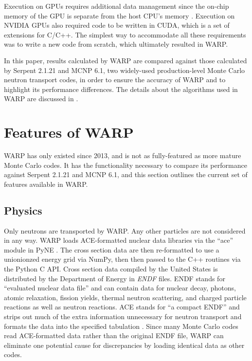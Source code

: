 \documentclass[preprint,12pt]{elsarticle}
\begin{document}
Execution on GPUs requires additional data management since the on-chip memory of the GPU is separate from the host CPU's memory \cite{cuda}.  Execution on NVIDIA GPUs also required code to be written in CUDA, which is a set of extensions for C/C++.  The simplest way to accommodate all these requirements was to write a new code from scratch, which ultimately resulted in WARP.  

In this paper, results calculated by WARP are compared against those calculated by Serpent 2.1.21 and MCNP 6.1, two widely-used production-level Monte Carlo neutron transport codes, in order to ensure the accuracy of WARP and to highlight its performance differences.  The details about the algorithms used in WARP are discussed in \cite{algorithms}.


\section{Features of WARP}
\label{sec:features}

WARP has only existed since 2013, and is not as fully-featured as more mature Monte Carlo codes.  It has the functionality necessary to compare its performance against  Serpent 2.1.21 and MCNP 6.1, and this section outlines the current set of features available in WARP.  

\subsection{Physics}

Only neutrons are transported by WARP.  Any other particles are not considered in any way.  WARP loads ACE-formatted nuclear data libraries via the ``ace'' module in PyNE \cite{pyne}.  The cross section data are then re-formatted to use a unionionzed energy grid via NumPy, then then passed to the C++ routines via the Python C API.  Cross section data compiled by the United States is distributed by the Department of Energy in \emph{ENDF} files.  ENDF stands for ``evaluated nuclear data file'' and can contain data for nuclear decay, photons, atomic relaxation, fission yields, thermal neutron scattering, and charged particle reactions as well as neutron reactions.  ACE stands for ``a compact ENDF'' and strips out much of the extra information unnecessary for neutron transport and formats the data into the specified tabulation \cite{endfnums}.  Since many Monte Carlo codes read ACE-formatted data rather than the original ENDF file, WARP can eliminate one potential cause for discrepancies by loading identical data as other codes.  
\end{document}
